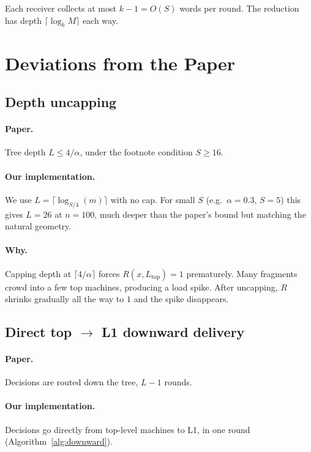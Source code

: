 \documentclass[11pt]{article}
\begin{document}
Each receiver collects at most $k - 1 = O(S)$ words per round. The
reduction has depth $\lceil \log_k M \rceil$ each way.

\section{Deviations from the Paper}
\label{sec:deviations}

\subsection{Depth uncapping}

\paragraph{Paper.} Tree depth $L \le 4/\alpha$, under the footnote condition
$S \ge 16$.

\paragraph{Our implementation.} We use $L = \lceil \log_{S/4}(m) \rceil$
with no cap. For small $S$ (e.g.\ $\alpha = 0.3$, $S = 5$) this gives
$L = 26$ at $n = 100$, much deeper than the paper's bound but matching the
natural geometry.

\paragraph{Why.} Capping depth at $\lceil 4/\alpha \rceil$ forces
$R(x, L_\text{top}) = 1$ prematurely. Many fragments crowd into a few top
machines, producing a load spike. After uncapping, $R$ shrinks gradually
all the way to $1$ and the spike disappears.

\subsection{Direct top \texorpdfstring{$\to$}{->} L1 downward delivery}

\paragraph{Paper.} Decisions are routed down the tree, $L - 1$ rounds.

\paragraph{Our implementation.} Decisions go directly from top-level
machines to L1, in one round (Algorithm~\ref{alg:downward}).
\end{document}
